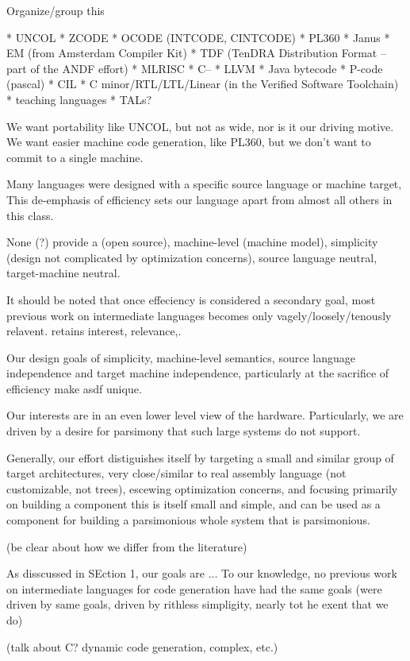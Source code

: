 Organize/group this

* UNCOL
* ZCODE
* OCODE (INTCODE, CINTCODE)
* PL360
* Janus
* EM (from Amsterdam Compiler Kit)
* TDF (TenDRA Distribution Format -- part of the ANDF effort)
* MLRISC
* C--
* LLVM
* Java bytecode
* P-code (pascal)
* CIL
* C minor/RTL/LTL/Linear (in the Verified Software Toolchain)
* teaching languages
* TALs?

We want portability like UNCOL, but not as wide, nor is it our driving motive.
We want easier machine code generation, like PL360, but we don't want to
  commit to a single machine.

Many languages were designed with a specific source language or machine target,
This de-emphasis of efficiency sets our language apart from almost all others in this class.

None (?) provide a (open source), machine-level (machine model),
simplicity (design not complicated by optimization concerns),
source language neutral,
target-machine neutral.

It should be noted that once effeciency is considered
a secondary goal, most previous work on intermediate languages
becomes only vagely/loosely/tenously relavent. retains
interest, relevance,.

Our design goals of simplicity, machine-level semantics, source language
independence and target machine independence, particularly at the sacrifice
of efficiency make asdf unique.

Our interests
are in an even lower level view of the hardware. Particularly, we are driven by a desire for
parsimony that such large systems do not support.

Generally, our effort distiguishes itself by targeting a small and similar group of target
architectures, very close/similar to real assembly language (not customizable, not trees), escewing optimization concerns,
and focusing primarily on building a component
this is itself small and simple, and can be used as a component for building a parsimonious
whole system that is parsimonious.

(be clear about how we differ from the literature)

As disscussed in SEction 1, our goals are ... To our knowledge, no previous
work on intermediate languages for code generation have had the same goals
(were driven by same goals, driven by rithless simpligity, nearly tot he exent that
we do)

(talk about C? dynamic code generation, complex, etc.)

